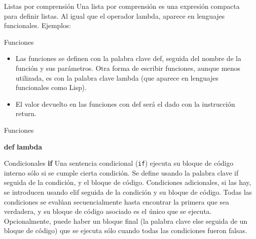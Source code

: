 \documentclass[hyperref={colorlinks=true}]{beamer}
\begin{document}
\begin{frame}{Listas por comprensión}
Una lista por comprensión es una expresión compacta para definir listas. Al igual que el operador lambda, aparece en lenguajes funcionales. Ejemplos:

\lstI
\end{frame}





\begin{frame}{Funciones}
\begin{itemize}

  \item<+->  Las funciones se definen con la palabra clave def, seguida del nombre de la función y sus parámetros. Otra forma de escribir funciones, aunque menos utilizada, es con la palabra clave lambda (que aparece en lenguajes funcionales como Lisp).
  \item<+->  El valor devuelto en las funciones con def será el dado con la instrucción return.
  \end{itemize}

\end{frame}
\begin{frame}{Funciones}

 \textbf{def}
\lstI
\textbf{lambda}
\lstII
\end{frame}


\begin{frame}{Condicionales}
\textbf{if} Una sentencia condicional (\verb~if~) ejecuta su bloque de código interno sólo si se cumple cierta condición. Se define usando la palabra clave if seguida de la condición, y el bloque de código. Condiciones adicionales, si las hay, se introducen usando elif seguida de la condición y su bloque de código. Todas las condiciones se evalúan secuencialmente hasta encontrar la primera que sea verdadera, y su bloque de código asociado es el único que se ejecuta. Opcionalmente, puede haber un bloque final (la palabra clave else seguida de un bloque de código) que se ejecuta sólo cuando todas las condiciones fueron falsas.

\end{frame}
\end{document}
